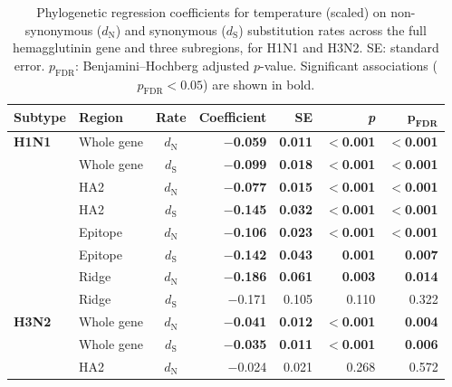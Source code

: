 \documentclass[11pt, a4paper]{article}
\begin{document}
\begin{table}[H]
    \centering
    \caption{Phylogenetic regression coefficients for temperature (scaled) on non-synonymous ($d_{\text{N}}$) and synonymous ($d_{\text{S}}$) substitution rates across the full hemagglutinin gene and three subregions, for H1N1 and H3N2. SE: standard error. $p_{\text{FDR}}$: Benjamini--Hochberg adjusted $p$-value. Significant associations ($p_{\text{FDR}} < 0.05$) are shown in bold.}
    \label{tab:s1_epitope_p}
    \begin{tabular}{llcrrrr}
        \toprule
        \textbf{Subtype} & \textbf{Region} & \textbf{Rate} & \textbf{Coefficient} & \textbf{SE} & \textbf{\textit{p}} & $\boldsymbol{p_{\text{FDR}}}$ \\
        \midrule
        \textbf{H1N1} & Whole gene & $d_{\text{N}}$ & \textbf{$-$0.059} & \textbf{0.011} & \textbf{$<$0.001} & \textbf{$<$0.001} \\
                      & Whole gene & $d_{\text{S}}$  & \textbf{$-$0.099} & \textbf{0.018} & \textbf{$<$0.001} & \textbf{$<$0.001} \\
                      & HA2        & $d_{\text{N}}$ & \textbf{$-$0.077} & \textbf{0.015} & \textbf{$<$0.001} & \textbf{$<$0.001} \\
                      & HA2        & $d_{\text{S}}$  & \textbf{$-$0.145} & \textbf{0.032} & \textbf{$<$0.001} & \textbf{$<$0.001} \\
                      & Epitope    & $d_{\text{N}}$ & \textbf{$-$0.106} & \textbf{0.023} & \textbf{$<$0.001} & \textbf{$<$0.001} \\
                      & Epitope    & $d_{\text{S}}$  & \textbf{$-$0.142} & \textbf{0.043} & \textbf{0.001}    & \textbf{0.007}    \\
                      & Ridge      & $d_{\text{N}}$ & \textbf{$-$0.186} & \textbf{0.061} & \textbf{0.003}    & \textbf{0.014}    \\
                      & Ridge      & $d_{\text{S}}$  & $-$0.171          & 0.105          & 0.110             & 0.322             \\
        \midrule
        \textbf{H3N2} & Whole gene & $d_{\text{N}}$ & \textbf{$-$0.041} & \textbf{0.012} & \textbf{$<$0.001} & \textbf{0.004}    \\
                      & Whole gene & $d_{\text{S}}$  & \textbf{$-$0.035} & \textbf{0.011} & \textbf{$<$0.001} & \textbf{0.006}    \\
                      & HA2        & $d_{\text{N}}$ & $-$0.024          & 0.021          & 0.268             & 0.572             \\

\end{tabular}
\end{table}
\end{document}
